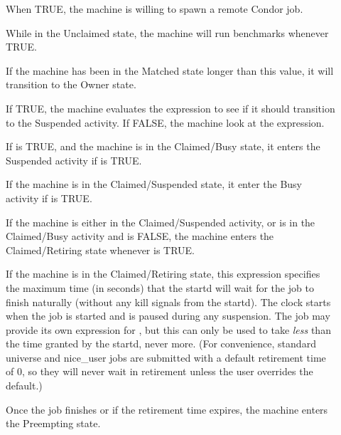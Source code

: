 \begin{description}
  
\item[] When TRUE, the machine is willing to spawn
  a remote Condor job.
  
\item[] While in the Unclaimed state, the machine
  will run benchmarks whenever TRUE.
  
\item[] If the machine has been in the Matched
  state longer than this value, it will transition to the Owner state.
  
\item[] If TRUE, the machine evaluates
  the  expression to see if it should transition to the
  Suspended activity.  If FALSE, the machine look at
  the  expression.
  
\item[] If  is TRUE, and the machine
  is in the Claimed/Busy state, it enters the Suspended activity
  if  is TRUE.
  
\item[] If the machine is in the Claimed/Suspended
  state, it enter the Busy activity if  is TRUE.
  
\item[] If the machine is either in the Claimed/Suspended
  activity, or is in the Claimed/Busy activity and
   is FALSE, the machine enters the Claimed/Retiring
  state whenever  is TRUE. 

\item[] If the machine is in the
Claimed/Retiring state, this expression specifies the maximum time (in
seconds) that the startd will wait for the job to finish naturally
(without any kill signals from the startd).  The clock starts when the
job is started and is paused during any suspension.  The job may
provide its own expression for , but this
can only be used to take \emph{less} than the time granted by the
startd, never more.  (For convenience, standard universe and
nice\_user jobs are submitted with a default retirement time of 0, so
they will never wait in retirement unless the user overrides the
default.)

Once the job finishes or if the retirement time expires, the machine
enters the Preempting state.
  

\end{description}
